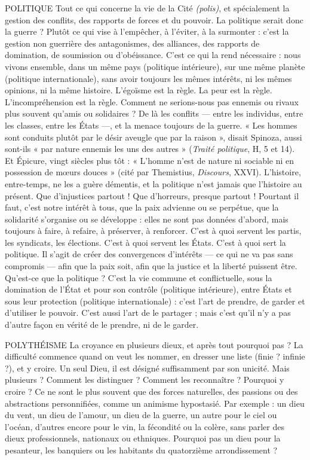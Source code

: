 POLITIQUE Tout ce qui concerne la vie de la Cité {\it (polis)}, et spécialement
la gestion des conflits, des rapports de forces et du pouvoir. La
politique serait donc la guerre ? Plutôt ce qui vise à l'empêcher, à l'éviter, à la
surmonter : c’est la gestion non guerrière des antagonismes, des alliances, des
rapports de domination, de soumission ou d’obéissance. C’est ce qui la rend
nécessaire : nous vivons ensemble, dans un même pays (politique intérieure),
sur une même planète (politique internationale), sans avoir toujours les mêmes
intérêts, ni les mêmes opinions, ni la même histoire. L'égoïsme est la règle. La
peur est la règle. L’incompréhension est la règle. Comment ne serions-nous pas
ennemis ou rivaux plus souvent qu’amis ou solidaires ? De là les conflits — entre
les individus, entre les classes, entre les États —, et la menace toujours de la
guerre. « Les hommes sont conduits plutôt par le désir aveugle que par la
raison », disait Spinoza, aussi sont-ils « par nature ennemis les uns des autres »
({\it Traité politique}, H, 5 et 14). Et Épicure, vingt siècles plus tôt : « L'homme
n'est de nature ni sociable ni en possession de mœurs douces » (cité par Themistius,
{\it Discours}, XXVI). L'histoire, entre-temps, ne les a guère démentis, et la
politique n’est jamais que l’histoire au présent. Que d’injustices partout ! Que
d’horreurs, presque partout ! Pourtant il faut, c’est notre intérêt à tous, que la
paix advienne ou se perpétue, que la solidarité s’organise ou se développe : elles
ne sont pas données d’abord, mais toujours à faire, à refaire, à préserver, à renforcer.
C’est à quoi servent les partis, les syndicats, les élections. C’est à quoi
servent les États. C’est à quoi sert la politique. Il s’agit de créer des convergences
d’intérêts — ce qui ne va pas sans compromis — afin que la paix soit, afin
que la justice et la liberté puissent être. Qu'est-ce que la politique ? C’est la vie
commune et conflictuelle, sous la domination de l’État et pour son contrôle
(politique intérieure), entre États et sous leur protection (politique internationale) :
c’est l’art de prendre, de garder et d’utiliser le pouvoir. C’est aussi
l’art de le partager ; mais c’est qu’il n’y a pas d’autre façon en vérité de le
prendre, ni de le garder.

POLYTHÉISME La croyance en plusieurs dieux, et après tout pourquoi pas ?
La difficulté commence quand on veut les nommer, en
dresser une liste (finie ? infinie ?), et y croire. Un seul Dieu, il est désigné suffisamment
par son unicité. Mais plusieurs ? Comment les distinguer ? Comment
les reconnaître ? Pourquoi y croire ? Ce ne sont le plus souvent que des forces
naturelles, des passions ou des abstractions personnifiées, comme un animisme
hypostasié. Par exemple : un dieu du vent, un dieu de l'amour, un dieu de la
guerre, un autre pour le ciel ou l’océan, d’autres encore pour le vin, la fécondité
ou la colère, sans parler des dieux professionnels, nationaux ou ethniques.
Pourquoi pas un dieu pour la pesanteur, les banquiers ou les habitants du quatorzième
arrondissement ?

